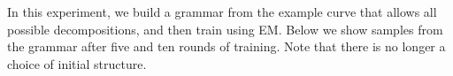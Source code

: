 In this experiment, we build a grammar from the example curve that
allows all possible decompositions, and then train using EM. Below we
show samples from the grammar after five and ten rounds of
training. Note that there is no longer a choice of initial structure.



% 

